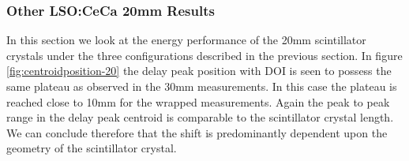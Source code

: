 \subsubsection{Other LSO:CeCa 20mm Results}
In this section we look at the energy performance of the 20mm scintillator crystals under the three configurations described in the previous section. In figure \ref{fig:centroidposition-20} the delay peak position with DOI is seen to possess the same plateau as observed in the 30mm measurements. In this case the plateau is reached close to 10mm for the wrapped measurements. Again the peak to peak range in the delay peak centroid is comparable to the scintillator crystal length. We can conclude therefore that the shift is predominantly dependent upon the geometry of the scintillator crystal. 